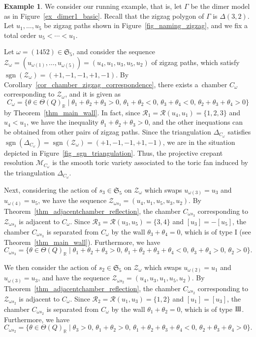 \documentclass[pdftex]{sigma}
\numberwithin{equation}{section}
\theoremstyle{definition}
\newtheorem{Example}[Theorem]{Example}
\newcommand{\RR}{\mathbb{R}}
\newcommand{\calM}{\mathcal{M}}
\newcommand{\calR}{\mathcal{R}}
\newcommand{\calZ}{\mathcal{Z}}
\newcommand{\fkS}{\mathfrak{S}}
\newcommand{\sgn}{\operatorname{sgn}}
\newcommand{\typeIII}{{\rm I\hspace{-0.7pt}I\hspace{-0.7pt}I}}
\newcommand{\permII}{\omega}
\begin{document}
\begin{Example}
\label{ex_compute_chamber_zigzag}
We consider our running example, that is, let $\Gamma$ be the dimer model as in Figure~\ref{ex_dimer1_basic}.
Recall that the zigzag polygon of $\Gamma$ is $\Delta(3,2)$.
Let $u_1, \dots, u_5$ be zigzag paths shown in Figure~\ref{fig_naming_zigzag}, and we fix a total order $u_5<\cdots<u_1$.

Let $\permII=(1452)\in\fkS_5$, and consider the sequence $\calZ_\permII=(u_{\permII(1)}, \dots, u_{\permII(5)})=(u_4,u_1,u_3,u_5,u_2)$ of zigzag paths,
which satisfy $\sgn(\calZ_\permII)=(+1,-1,-1,+1,-1)$.
By Corollary~\ref{cor_chamber_zigzag_correspondence},
there exists a~chamber $C_\permII$ corresponding to $\calZ_\permII$, and it is given as
\begin{equation*}%
C_\permII=\{\theta\in\Theta(Q)_\RR \mid \theta_1+\theta_2+\theta_3>0, \, \theta_1+\theta_2<0, \, \theta_3+\theta_4<0, \, \theta_2+\theta_3+\theta_4>0\}
\end{equation*}
by Theorem~\ref{thm_main_wall}.
In fact, since $\calR_1=\calR(u_4,u_1)=\{1,2,3\}$ and $u_4<u_1$, we have the inequality $\theta_1+\theta_2+\theta_3>0$,
and the other inequations can be obtained from other pairs of zigzag paths.
Since the triangulation $\Delta_{C_\permII}$ satisfies $\sgn(\Delta_{C_\permII})=\sgn(\calZ_\permII)=(+1,-1,-1,+1,-1)$,
we are in the situation depicted in Figure~\ref{fig_sgn_triangulation}.
Thus, the projective crepant resolution $\calM_{C_\permII}$ is the smooth toric variety associated to the toric fan induced by the triangulation $\Delta_{C_\permII}$.

Next, considering the action of $s_3\in\fkS_5$ on $\calZ_\permII$ which swaps $u_{\permII(3)}=u_3$ and $u_{\permII(4)}=u_5$,
we have the sequence $\calZ_{\permII s_3}=(u_4,u_1,u_5,u_3,u_2)$.
By Theorem~\ref{thm_adjacentchamber_reflection}, the chamber $C_{\permII s_3}$ corresponding to $\calZ_{\permII s_3}$ is adjacent to $C_\permII$.
Since $\calR_3=\calR(u_3,u_5)=\{3,4\}$ and $[u_3]=-[u_5]$,
the chamber $C_{\permII s_3}$ is separated from $C_\permII$ by the wall $\theta_3+\theta_4=0$, which is of type I (see Theorem~\ref{thm_main_wall}).
Furthermore, we have
\[
C_{\permII s_3}=\{\theta\in\Theta(Q)_\RR \mid \theta_1+\theta_2+\theta_3>0, \, \theta_1+\theta_2+\theta_3+\theta_4<0, \,
\theta_3+\theta_4>0, \, \theta_2>0\}.
\]

We then consider the action of $s_2\in\fkS_5$ on $\calZ_\permII$ which swaps $u_{\permII(2)}=u_1$ and $u_{\permII(3)}=u_3$,
and have the sequence $\calZ_{\permII s_2}=(u_4,u_3,u_1,u_5,u_2)$.
By Theorem~\ref{thm_adjacentchamber_reflection}, the chamber $C_{\permII s_2}$ corresponding to $\calZ_{\permII s_2}$ is adjacent to $C_\permII$.
Since $\calR_2=\calR(u_1,u_3)=\{1,2\}$ and $[u_1]= [u_3]$,
the chamber $C_{\permII s_2}$ is separated from $C_\permII$ by the wall $\theta_1+\theta_2=0$, which is of type $\typeIII$.
Furthermore, we have
\[
C_{\permII s_2}=\{\theta\in\Theta(Q)_\RR \mid \theta_3>0, \, \theta_1+\theta_2>0, \, \theta_1+\theta_2+\theta_3+\theta_4<0, \,
\theta_2+\theta_3+\theta_4>0\}.
\]
\end{Example}
\end{document}
